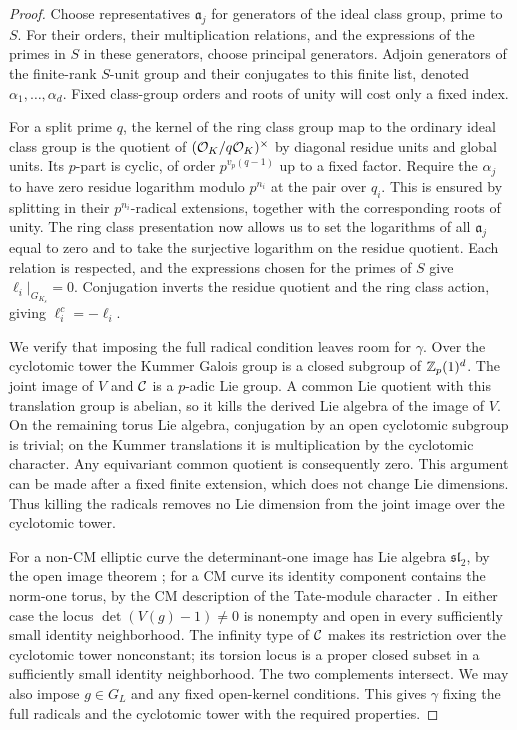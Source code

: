 \begin{proof}
Choose representatives $\mathfrak a_j$ for generators of the ideal
class group, prime to $S$.  For their orders, their multiplication
relations, and the expressions of the primes in $S$ in these
generators, choose principal generators.  Adjoin generators of the
finite-rank $S$-unit group and their conjugates to this finite list,
denoted $\alpha_1,\ldots,\alpha_d$.  Fixed class-group orders and
roots of unity will cost only a fixed index.

For a split prime $q$, the kernel of the ring class group map to the
ordinary ideal class group is the quotient of
$(\mathcal O_K/q\mathcal O_K)^\times$ by diagonal residue units and global units.
Its $p$-part is cyclic, of order $p^{v_p(q-1)}$ up to a fixed factor.
Require the $\alpha_j$ to have zero residue logarithm modulo
$p^{n_i}$ at the pair over $q_i$.  This is ensured by splitting in
their $p^{n_i}$-radical extensions, together with the corresponding
roots of unity.  The ring class presentation now allows us to set
the logarithms of all $\mathfrak a_j$ equal to zero and to take the
surjective logarithm on the residue quotient.  Each relation is
respected, and the expressions chosen for the primes of $S$ give
$\ell_i|_{G_{K_s}}=0$.  Conjugation inverts the residue quotient and
the ring class action, giving $\ell_i^c=-\ell_i$.

We verify that imposing the full radical condition leaves room for
$\gamma$.  Over the cyclotomic tower the Kummer Galois group is a
closed subgroup of $\mathbb Z_p(1)^d$.  The joint image of $V$ and $\mathcal C$
is a $p$-adic Lie group.  A common Lie quotient with this translation
group is abelian, so it kills the derived Lie algebra of the image
of $V$.  On the remaining torus Lie algebra, conjugation by an open
cyclotomic subgroup is trivial; on the Kummer translations it is
multiplication by the cyclotomic character.  Any equivariant common
quotient is consequently zero.  This argument can be made after a
fixed finite extension, which does not change Lie dimensions.
Thus killing the radicals removes no Lie dimension from the joint
image over the cyclotomic tower.

For a non-CM elliptic curve the determinant-one image has Lie
algebra $\mathfrak{sl}_2$, by the open image theorem
\cite{Serre1972}; for a CM curve its identity component contains
the norm-one torus, by the CM description of the Tate-module
character \cite{Serre1968}.  In either
case the locus $\det(V(g)-1)\ne0$ is nonempty and open in every
sufficiently small identity neighborhood.  The infinity type of
$\mathcal C$ makes its restriction over the cyclotomic tower nonconstant;
its torsion locus is a proper closed subset in a sufficiently small
identity neighborhood.  The two complements intersect.  We may
also impose $g\in G_L$ and any fixed open-kernel conditions.  This
gives $\gamma$ fixing the full radicals and the cyclotomic tower
with the required properties.


\end{proof}
